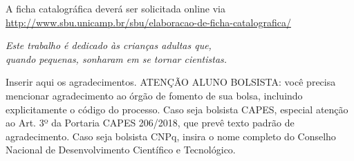 \documentclass[
	oldfontcommands,
	sumario=tradicional,
	12pt,      %
	openright, %
	oneside,   %
	a4paper,   %
	english, %
	brazil   %
	]{imecc-unicamp}
\begin{document}
	\frenchspacing %
	
		\pretextual
		
		\imprimirprimeirafolha %
		
			\imprimirfolhaderosto
		
			\begin{fichacatalografica}
				\begin{center}
					{\ABNTEXchapterfont\large A ficha catalográfica deverá ser solicitada online via \url{http://www.sbu.unicamp.br/sbu/elaboracao-de-ficha-catalografica/}}
				\end{center}
			\end{fichacatalografica}
		
			\begin{folhadeaprovacao}
			\end{folhadeaprovacao}
		
			\begin{dedicatoria}
				\vspace*{\fill}
				\centering
				\noindent
				\textit{
					Este trabalho é dedicado às crianças adultas que,\\
					quando pequenas, sonharam em se tornar cientistas.
				}
				\vspace*{\fill}
			\end{dedicatoria}
		
			\begin{agradecimentos}
				Inserir aqui os agradecimentos. ATENÇÃO ALUNO BOLSISTA: você precisa mencionar agradecimento ao órgão de fomento de sua bolsa, incluindo explicitamente o código do processo. Caso seja bolsista CAPES, especial atenção ao Art. 3º da Portaria CAPES 206/2018, que prevê texto padrão de agradecimento. Caso seja bolsista CNPq, insira o nome completo do Conselho Nacional de Desenvolvimento Científico e Tecnológico.
			\end{agradecimentos}
			
\end{document}
